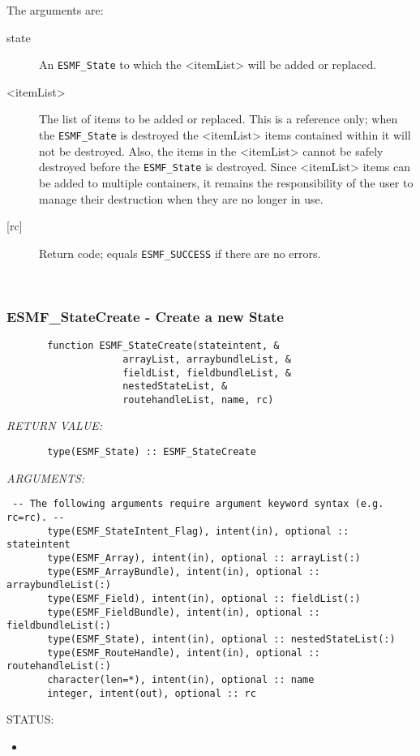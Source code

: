    The arguments are:
   \begin{description}
   \item[state]
   An {\tt ESMF\_State} to which the <itemList> will be added or replaced.
   \item[<itemList>]
   The list of items to be added or replaced.
   This is a reference only; when
   the {\tt ESMF\_State} is destroyed the <itemList> items contained within it will
   not be destroyed. Also, the items in the <itemList> cannot be safely
   destroyed before the {\tt ESMF\_State} is destroyed.
   Since <itemList> items can be added to multiple containers, it remains
   the responsibility of the user to manage their
   destruction when they are no longer in use.
   \item[{[rc]}]
   Return code; equals {\tt ESMF\_SUCCESS} if there are no errors.
   \end{description} 
 
\mbox{}\hrulefill\ 
 
\subsubsection [ESMF\_StateCreate] {ESMF\_StateCreate - Create a new State}


\begin{verbatim}       function ESMF_StateCreate(stateintent, &
                    arrayList, arraybundleList, &
                    fieldList, fieldbundleList, &
                    nestedStateList, &
                    routehandleList, name, rc)\end{verbatim}{\em RETURN VALUE:}
\begin{verbatim}       type(ESMF_State) :: ESMF_StateCreate\end{verbatim}{\em ARGUMENTS:}
\begin{verbatim} -- The following arguments require argument keyword syntax (e.g. rc=rc). --
       type(ESMF_StateIntent_Flag), intent(in), optional :: stateintent
       type(ESMF_Array), intent(in), optional :: arrayList(:)
       type(ESMF_ArrayBundle), intent(in), optional :: arraybundleList(:)
       type(ESMF_Field), intent(in), optional :: fieldList(:)
       type(ESMF_FieldBundle), intent(in), optional :: fieldbundleList(:)
       type(ESMF_State), intent(in), optional :: nestedStateList(:)
       type(ESMF_RouteHandle), intent(in), optional :: routehandleList(:)
       character(len=*), intent(in), optional :: name
       integer, intent(out), optional :: rc\end{verbatim}
{\sf STATUS:}
   \begin{itemize}
   \item{}
   \end{itemize}
  
